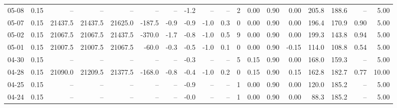 \begin{threeparttable}
{\begin{tabular}{lrrrrrrrrrrrrrrrrr}
  05-08 &     0.15 &      -- &      -- &      -- &         -- &             -- &                      -1.2 &                       -- &                  -- &              2 &       0.00 &      0.90 &           0.00 &            205.8 &               188.6 &              -- &                   5.00 \\
  05-07 &     0.15 & 21437.5 & 21437.5 & 21625.0 &     -187.5 &           -0.9 &                      -0.9 &                     -1.0 &                 0.3 &              0 &       0.00 &      0.90 &           0.00 &            196.4 &               170.9 &            0.90 &                   5.00 \\
  05-02 &     0.15 & 21067.5 & 21067.5 & 21437.5 &     -370.0 &           -1.7 &                      -0.8 &                     -1.0 &                 0.5 &              9 &       0.00 &      0.90 &           0.00 &            199.3 &               143.8 &            0.94 &                   5.00 \\
  05-01 &     0.15 & 21007.5 & 21007.5 & 21067.5 &      -60.0 &           -0.3 &                      -0.5 &                     -1.0 &                 0.1 &              0 &       0.00 &      0.90 &          -0.15 &            114.0 &               108.8 &            0.54 &                   5.00 \\
  04-30 &     0.15 &      -- &      -- &      -- &         -- &             -- &                      -0.3 &                       -- &                  -- &              5 &       0.15 &      0.90 &           0.00 &            168.0 &               159.3 &              -- &                   5.00 \\
  04-28 &     0.15 & 21090.0 & 21209.5 & 21377.5 &     -168.0 &           -0.8 &                      -0.4 &                     -1.0 &                 0.2 &              0 &       0.15 &      0.90 &           0.15 &            162.8 &               182.7 &            0.77 &                  10.00 \\
  04-25 &     0.15 &      -- &      -- &      -- &         -- &             -- &                      -0.9 &                       -- &                  -- &              1 &       0.00 &      0.90 &           0.00 &            120.0 &               185.2 &              -- &                   5.00 \\
  04-24 &     0.15 &      -- &      -- &      -- &         -- &             -- &                      -0.0 &                       -- &                  -- &              1 &       0.00 &      0.90 &           0.00 &             88.3 &               185.2 &              -- &                   5.00 \\

\end{tabular}}
\end{threeparttable}
